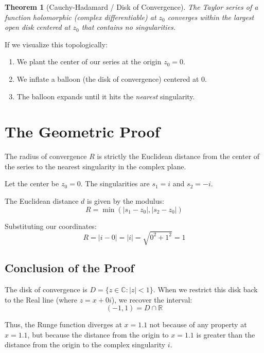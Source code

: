 \documentclass[11pt, letterpaper]{article}
\newtheorem{theorem}{Theorem}[section]
\theoremstyle{definition}
\theoremstyle{remark}
\newcommand{\R}{\mathbb{R}}
\newcommand{\C}{\mathbb{C}}
\begin{document}
\begin{theorem}[Cauchy-Hadamard / Disk of Convergence]
    The Taylor series of a function holomorphic (complex differentiable) at $z_0$ converges within the largest open disk centered at $z_0$ that contains no singularities.
\end{theorem}

If we visualize this topologically:
\begin{enumerate}
    \item We plant the center of our series at the origin $z_0 = 0$.
    \item We inflate a balloon (the disk of convergence) centered at 0.
    \item The balloon expands until it hits the \textit{nearest} singularity.
\end{enumerate}

\section{The Geometric Proof}

The radius of convergence $R$ is strictly the Euclidean distance from the center of the series to the nearest singularity in the complex plane.

Let the center be $z_0 = 0$.
The singularities are $s_1 = i$ and $s_2 = -i$.

The Euclidean distance $d$ is given by the modulus:
\begin{equation}
    R = \min(|s_1 - z_0|, |s_2 - z_0|)
\end{equation}

Substituting our coordinates:
\begin{equation}
    R = |i - 0| = |i| = \sqrt{0^2 + 1^2} = 1
\end{equation}

\subsection{Conclusion of the Proof}
The disk of convergence is $D = \{ z \in \C : |z| < 1 \}$.
When we restrict this disk back to the Real line (where $z = x + 0i$), we recover the interval:
\begin{equation}
    (-1, 1) = D \cap \R
\end{equation}

Thus, the Runge function diverges at $x=1.1$ not because of any property at $x=1.1$, but because the distance from the origin to $x=1.1$ is greater than the distance from the origin to the complex singularity $i$.
\end{document}
